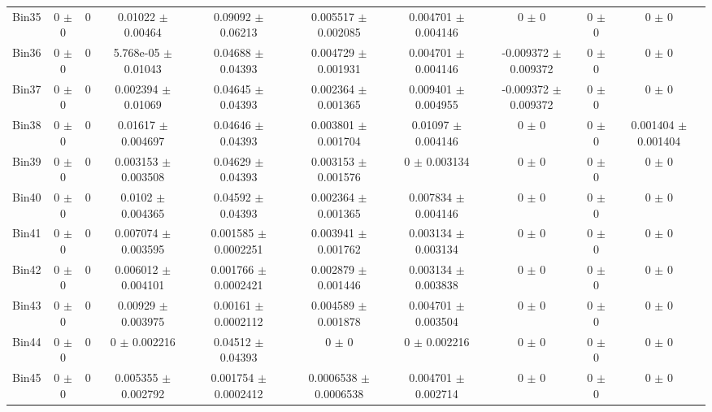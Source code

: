 \begin{tabular}{@{\extracolsep{4pt}}lccccccccc@{}}
     Bin35 & 0 $\pm$ 0 & 0 & 0.01022 $\pm$ 0.00464 & 0.09092 $\pm$ 0.06213 & 0.005517 $\pm$ 0.002085 & 0.004701 $\pm$ 0.004146 & 0 $\pm$ 0 & 0 $\pm$ 0 & 0 $\pm$ 0 \\ 
     Bin36 & 0 $\pm$ 0 & 0 & 5.768e-05 $\pm$ 0.01043 & 0.04688 $\pm$ 0.04393 & 0.004729 $\pm$ 0.001931 & 0.004701 $\pm$ 0.004146 & -0.009372 $\pm$ 0.009372 & 0 $\pm$ 0 & 0 $\pm$ 0 \\ 
     Bin37 & 0 $\pm$ 0 & 0 & 0.002394 $\pm$ 0.01069 & 0.04645 $\pm$ 0.04393 & 0.002364 $\pm$ 0.001365 & 0.009401 $\pm$ 0.004955 & -0.009372 $\pm$ 0.009372 & 0 $\pm$ 0 & 0 $\pm$ 0 \\ 
     Bin38 & 0 $\pm$ 0 & 0 & 0.01617 $\pm$ 0.004697 & 0.04646 $\pm$ 0.04393 & 0.003801 $\pm$ 0.001704 & 0.01097 $\pm$ 0.004146 & 0 $\pm$ 0 & 0 $\pm$ 0 & 0.001404 $\pm$ 0.001404 \\ 
     Bin39 & 0 $\pm$ 0 & 0 & 0.003153 $\pm$ 0.003508 & 0.04629 $\pm$ 0.04393 & 0.003153 $\pm$ 0.001576 & 0 $\pm$ 0.003134 & 0 $\pm$ 0 & 0 $\pm$ 0 & 0 $\pm$ 0 \\ 
     Bin40 & 0 $\pm$ 0 & 0 & 0.0102 $\pm$ 0.004365 & 0.04592 $\pm$ 0.04393 & 0.002364 $\pm$ 0.001365 & 0.007834 $\pm$ 0.004146 & 0 $\pm$ 0 & 0 $\pm$ 0 & 0 $\pm$ 0 \\ 
     Bin41 & 0 $\pm$ 0 & 0 & 0.007074 $\pm$ 0.003595 & 0.001585 $\pm$ 0.0002251 & 0.003941 $\pm$ 0.001762 & 0.003134 $\pm$ 0.003134 & 0 $\pm$ 0 & 0 $\pm$ 0 & 0 $\pm$ 0 \\ 
     Bin42 & 0 $\pm$ 0 & 0 & 0.006012 $\pm$ 0.004101 & 0.001766 $\pm$ 0.0002421 & 0.002879 $\pm$ 0.001446 & 0.003134 $\pm$ 0.003838 & 0 $\pm$ 0 & 0 $\pm$ 0 & 0 $\pm$ 0 \\ 
     Bin43 & 0 $\pm$ 0 & 0 & 0.00929 $\pm$ 0.003975 & 0.00161 $\pm$ 0.0002112 & 0.004589 $\pm$ 0.001878 & 0.004701 $\pm$ 0.003504 & 0 $\pm$ 0 & 0 $\pm$ 0 & 0 $\pm$ 0 \\ 
     Bin44 & 0 $\pm$ 0 & 0 & 0 $\pm$ 0.002216 & 0.04512 $\pm$ 0.04393 & 0 $\pm$ 0 & 0 $\pm$ 0.002216 & 0 $\pm$ 0 & 0 $\pm$ 0 & 0 $\pm$ 0 \\ 
     Bin45 & 0 $\pm$ 0 & 0 & 0.005355 $\pm$ 0.002792 & 0.001754 $\pm$ 0.0002412 & 0.0006538 $\pm$ 0.0006538 & 0.004701 $\pm$ 0.002714 & 0 $\pm$ 0 & 0 $\pm$ 0 & 0 $\pm$ 0 \\ 
\hline\hline
  \end{tabular}
